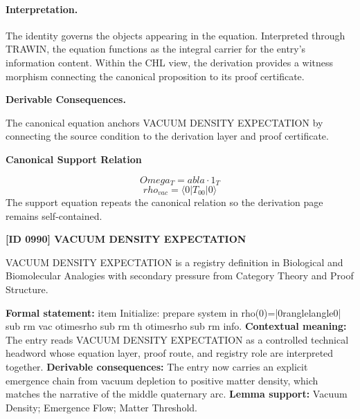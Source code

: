 \paragraph{Interpretation.}
The identity governs the objects appearing in the equation. Interpreted through TRAWIN, the equation functions as the integral carrier for the entry’s information content. Within the CHL view, the derivation provides a witness morphism connecting the canonical proposition to its proof certificate.

\par\vspace{0.35em}
\noindent\textbf{Derivable Consequences.}\quad
\begingroup
\footnotesize
\raggedright
The canonical equation anchors VACUUM DENSITY EXPECTATION by connecting the source condition to the derivation layer and proof certificate.
\par\endgroup

\noindent\textbf{Canonical Support Relation}\par
\[
Omega_T =  abla \cdot 1_T
\]
\[
rho_{vac} = \langle 0 | T_{00} | 0 \rangle
\]
\noindent The support equation repeats the canonical relation so the derivation page remains self-contained.\par

\clearpage
\noindent\textbf{[ID 0990] VACUUM DENSITY EXPECTATION}\par
\vspace{0.35em}
\begingroup\small
{}
VACUUM DENSITY EXPECTATION is a registry definition in Biological and Biomolecular Analogies with secondary pressure from Category Theory and Proof Structure.

\begingroup\footnotesize\setlength{\emergencystretch}{3em}\sloppy
\textbf{Formal statement:} item Initialize: prepare system in rho(0)=|0ranglelangle0| sub rm vac otimesrho sub rm th otimesrho sub rm info. \textbf{Contextual meaning:} The entry reads VACUUM DENSITY EXPECTATION as a controlled technical headword whose equation layer, proof route, and registry role are interpreted together. \textbf{Derivable consequences:} The entry now carries an explicit emergence chain from vacuum depletion to positive matter density, which matches the narrative of the middle quaternary arc. \textbf{Lemma support:} Vacuum Density; Emergence Flow; Matter Threshold.\par
\endgroup

